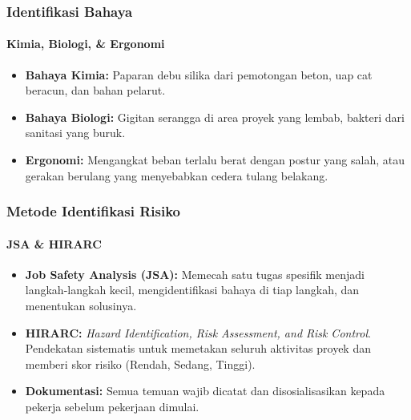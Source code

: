 \documentclass[../main.tex]{subfiles}
\begin{document}
\begin{frame}[mytitle=standard, t]
	\frametitle{Identifikasi Bahaya}
	\framesubtitle{Kimia, Biologi, \& Ergonomi}

	\begin{itemize}
		\item \textbf{Bahaya Kimia:} Paparan debu silika dari pemotongan beton, uap cat beracun, dan bahan pelarut.
		\item \textbf{Bahaya Biologi:} Gigitan serangga di area proyek yang lembab, bakteri dari sanitasi yang buruk.
		\item \textbf{Ergonomi:} Mengangkat beban terlalu berat dengan postur yang salah, atau gerakan berulang yang menyebabkan cedera tulang belakang.
	\end{itemize}

	\vfill
\end{frame}

\begin{frame}[mytitle=standard, c, mycolor=digiPH_cream]
	\frametitle{Metode Identifikasi Risiko}
	\framesubtitle{JSA \& HIRARC}

	\begin{itemize}
		\item \textbf{Job Safety Analysis (JSA):} Memecah satu tugas spesifik menjadi langkah-langkah kecil, mengidentifikasi bahaya di tiap langkah, dan menentukan solusinya.
		\item \textbf{HIRARC:} \textit{Hazard Identification, Risk Assessment, and Risk Control}. Pendekatan sistematis untuk memetakan seluruh aktivitas proyek dan memberi skor risiko (Rendah, Sedang, Tinggi).
		\item \textbf{Dokumentasi:} Semua temuan wajib dicatat dan disosialisasikan kepada pekerja sebelum pekerjaan dimulai.
	\end{itemize}

	\vfill
\end{frame}
\end{document}
